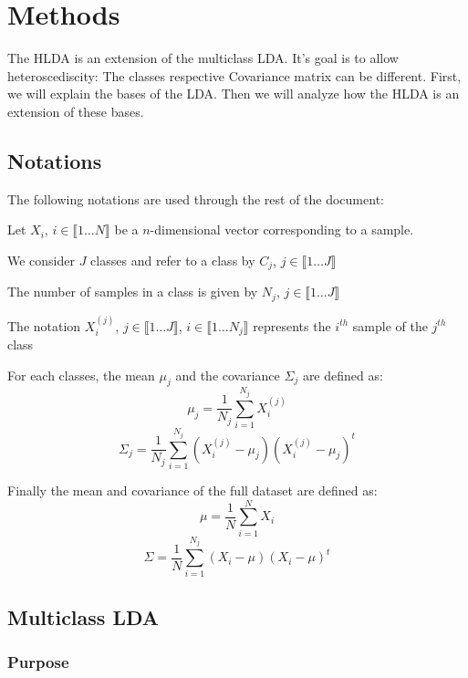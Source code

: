 
\section{Methods}
\label{sec:definitions}

The HLDA is an extension of the multiclass LDA.
It's goal is to allow heteroscediscity: The classes respective Covariance matrix can be different.
First, we will explain the bases of the LDA.
Then we will analyze how the HLDA is an extension of these bases.

\subsection{Notations}

The following notations are used through the rest of the document:

\begin{itemize*}
  \item Let $X_i$, $i \in \llbracket 1 \ldots N \rrbracket$ be a $n$-dimensional vector corresponding to a sample.
  \item We consider $J$ classes and refer to a class by $C_j$, $j \in \llbracket 1 \ldots J \rrbracket$
  \item The number of samples in a class is given by $N_j$, $j \in \llbracket 1 \ldots J \rrbracket$
  \item The notation $X_i^{(j)}$, $j \in \llbracket 1 \ldots J \rrbracket$, $i \in \llbracket 1 \ldots N_j \rrbracket$
    represents the $i^{th}$ sample of the $j^{th}$ class
  \item For each classes, the mean $\mu_j$ and the covariance $\Sigma_j$ are defined as:
    $$\mu_j = \frac{1}{N_j}\sum\limits_{i = 1}^{N_j} X_i^{(j)}$$
    $$\Sigma_j = \frac{1}{N_j}\sum\limits_{i = 1}^{N_j} (X_i^{(j)} - \mu_j)(X_i^{(j)} - \mu_j)^t$$
  \item Finally the mean and covariance of the full dataset are defined as:
    $$\mu = \frac{1}{N}\sum\limits_{i = 1}^{N} X_i$$
    $$\Sigma = \frac{1}{N}\sum\limits_{i = 1}^{N_j} (X_i - \mu)(X_i - \mu)^t$$
\end{itemize*}

\subsection{Multiclass LDA}

\subsubsection{Purpose}

